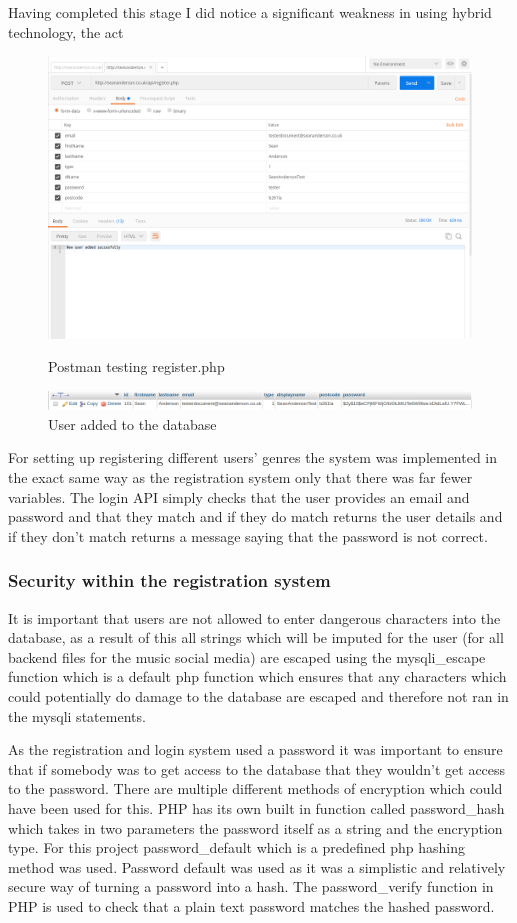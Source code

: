 Having completed this stage I did notice a significant weakness in using hybrid technology, the act
\begin{figure}[H]
\includegraphics[scale=0.45]{images/postman}
\caption{Postman testing register.php}
\includegraphics[scale=0.45]{images/db1}
\caption{User added to the database}
\end{figure}

For setting up registering different users' genres the system was implemented in the exact same way as the registration system only that there was far fewer variables. The login API simply checks that the user provides an email and password and that they match and if they do match returns the user details and if they don't match returns a message saying that the password is not correct.

\subsubsection{Security within the registration system}
It is important that users are not allowed to enter dangerous characters into the database, as a result of this all strings which will be imputed for the user (for all backend files for the music social media) are escaped using the mysqli\_escape function which is a default php function which ensures that any characters which could potentially do damage to the database are escaped and therefore not ran in the mysqli statements.

As the registration and login system used a password it was important to ensure that if somebody was to get access to the database that they wouldn't get access to the password. There are multiple different methods of encryption which could have been used for this. PHP has its own built in function called password\_hash which takes in two parameters the password itself as a string and the encryption type. For this project password\_default which is a predefined php hashing method was used. Password default was used as it was a simplistic and relatively secure way of turning a password into a hash. The password\_verify function in PHP is used to check that a plain text password matches the hashed password.
 
